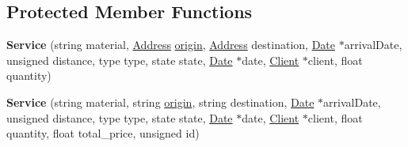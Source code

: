 \subsection*{Protected Member Functions}
\begin{DoxyCompactItemize}
\item 
\mbox{\label{class_service_ab00ec0b62c00dc5dfad8442c85de3b12}} 
{\bfseries Service} (string material, \hyperlink{class_address}{Address} \hyperlink{class_service_a4abd0a104d97e5bdb8e8ca93bab31ce7}{origin}, \hyperlink{class_address}{Address} destination, \hyperlink{class_date}{Date} $\ast$arrival\+Date, unsigned distance, type type, state state, \hyperlink{class_date}{Date} $\ast$date, \hyperlink{class_client}{Client} $\ast$client, float quantity)
\item 
\mbox{\label{class_service_aa8037c739c084ca5f12d25de6316d5ca}} 
{\bfseries Service} (string material, string \hyperlink{class_service_a4abd0a104d97e5bdb8e8ca93bab31ce7}{origin}, string destination, \hyperlink{class_date}{Date} $\ast$arrival\+Date, unsigned distance, type type, state state, \hyperlink{class_date}{Date} $\ast$date, \hyperlink{class_client}{Client} $\ast$client, float quantity, float total\+\_\+price, unsigned id)
\end{DoxyCompactItemize}
